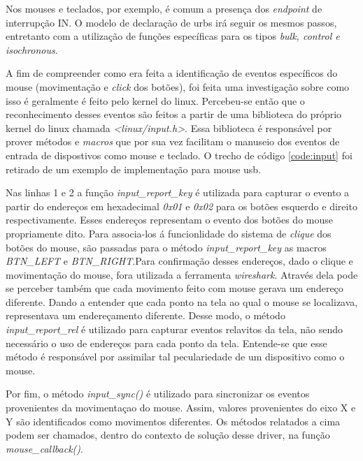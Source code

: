 Nos mouses e teclados, por exemplo, é comum a presença dos \textit{endpoint} de interrupção IN.
O modelo de declaração de urbs irá seguir os mesmos passos, entretanto com a utilização
de funções específicas para os tipos \textit{bulk, control e isochronous}.

A fim de compreender como era feita a identificação de eventos específicos do mouse (movimentação e \textit{click} dos botões), foi 
feita uma investigação sobre como isso é geralmente é feito pelo kernel do linux. Percebeu-se então que o reconhecimento desses eventos são feitos a partir de uma biblioteca do próprio kernel do linux chamada \textit{<linux/input.h>}. Essa biblioteca é responsável por prover métodos e \textit{macros} que por sua vez facilitam o manuseio dos eventos de entrada de dispostivos como mouse e teclado. O trecho de código \ref{code:input} foi retirado de um exemplo de implementação para mouse usb.
\lstset{style=shell}


Nas linhas 1 e 2 a função \textit{input\_report\_key} é utilizada para capturar o evento a partir do endereços em hexadecimal \textit{0x01} e \textit{0x02} para os botões esquerdo e direito respectivamente. Esses endereços representam o evento dos botões do mouse propriamente dito. Para associa-los á funcionlidade do sistema de \textit{clique} dos botões do mouse, são passadas para o método \textit{input\_report\_key} as macros \textit{BTN\_LEFT} e \textit{BTN\_RIGHT}.Para confirmação desses endereços, dado o clique e movimentação do mouse, fora utilizada a ferramenta \textit{wireshark}. Através dela pode se perceber também que 
cada movimento feito com mouse gerava um endereço diferente. Dando a entender que cada ponto na tela ao qual o mouse se localizava, representava um endereçamento diferente. Desse modo, o método \textit{input\_report\_rel} é utilizado para capturar eventos relavitos da tela, não sendo necessário o uso de endereços para cada ponto da tela. Entende-se que esse método é responsável por assimilar tal peculariedade de um dispositivo como o mouse.

Por fim, o método \textit{input\_sync()} é utilizado para sincronizar os eventos provenientes da movimentaçao do mouse. Assim, valores provenientes do eixo X e Y são identificados como movimentos diferentes. Os métodos relatados a cima podem ser chamados, dentro do contexto de solução desse driver, na função \textit{mouse\_callback()}.

